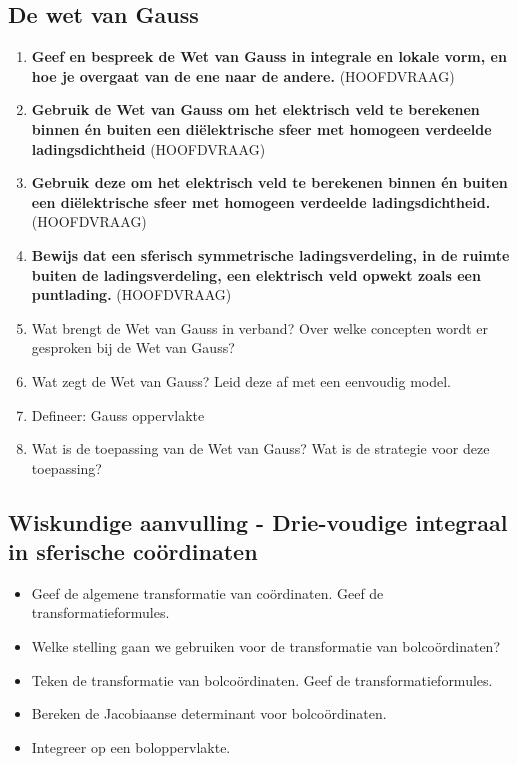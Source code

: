 \documentclass[a4paper,12pt]{article}
\begin{document}
    \subsection{De wet van Gauss}
    \begin{enumerate}
        \item \textbf{Geef en bespreek de Wet van Gauss in integrale en lokale vorm, en hoe je overgaat van de ene naar de andere.} (HOOFDVRAAG)
        \item \textbf{Gebruik de Wet van Gauss om het elektrisch veld te berekenen binnen én buiten een diëlektrische sfeer met homogeen verdeelde ladingsdichtheid} (HOOFDVRAAG)
        \item \textbf{Gebruik deze om het elektrisch veld te berekenen binnen én buiten een diëlektrische sfeer met homogeen verdeelde ladingsdichtheid.} (HOOFDVRAAG)
        \item \textbf{Bewijs dat een sferisch symmetrische ladings­verdeling, in de ruimte buiten de ladingsverdeling, een elektrisch veld opwekt zoals een puntlading.} (HOOFDVRAAG)
        \item Wat brengt de Wet van Gauss in verband? Over welke concepten wordt er gesproken bij de Wet van Gauss?
        \item Wat zegt de Wet van Gauss? Leid deze af met een eenvoudig model.
        \item Defineer: Gauss oppervlakte
        \item Wat is de toepassing van de Wet van Gauss? Wat is de strategie voor deze toepassing?
    \end{enumerate}
    \subsection*{Wiskundige aanvulling - Drie-voudige integraal in sferische coördinaten}
    \begin{itemize}
        \item Geef de algemene transformatie van coördinaten. Geef de transformatieformules.
        \item Welke stelling gaan we gebruiken voor de transformatie van bolcoördinaten?
        \item Teken de transformatie van bolcoördinaten. Geef de transformatieformules.
        \item Bereken de Jacobiaanse determinant voor bolcoördinaten.
        \item Integreer op een boloppervlakte.
    \end{itemize}
\end{document}
